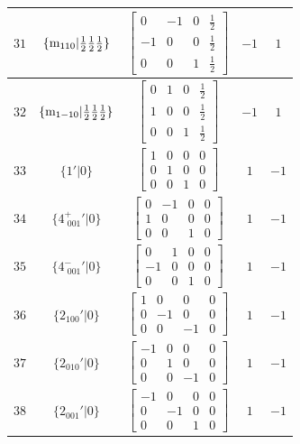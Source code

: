 \documentclass[fleqn,8pt]{jsarticle}
\begin{document}
\begin{longtable}{ccccc}
$ 31 $ & $ \{{\rm m}_{110}|\frac{1}{2} \frac{1}{2} \frac{1}{2}\} $ & $ \begin{bmatrix} 0 & -1 & 0 & \frac{1}{2} \\ -1 & 0 & 0 & \frac{1}{2} \\ 0 & 0 & 1 & \frac{1}{2} \end{bmatrix} $ & $ -1 $ & $ 1 $ \\ \hline
$ 32 $ & $ \{{\rm m}_{1-10}|\frac{1}{2} \frac{1}{2} \frac{1}{2}\} $ & $ \begin{bmatrix} 0 & 1 & 0 & \frac{1}{2} \\ 1 & 0 & 0 & \frac{1}{2} \\ 0 & 0 & 1 & \frac{1}{2} \end{bmatrix} $ & $ -1 $ & $ 1 $ \\ \hline
$ 33 $ & $ \{1{}'|0\} $ & $ \begin{bmatrix} 1 & 0 & 0 & 0 \\ 0 & 1 & 0 & 0 \\ 0 & 0 & 1 & 0 \end{bmatrix} $ & $ 1 $ & $ -1 $ \\ \hline
$ 34 $ & $ \{4^{+}_{\,\,001}{}'|0\} $ & $ \begin{bmatrix} 0 & -1 & 0 & 0 \\ 1 & 0 & 0 & 0 \\ 0 & 0 & 1 & 0 \end{bmatrix} $ & $ 1 $ & $ -1 $ \\ \hline
$ 35 $ & $ \{4^{-}_{\,\,001}{}'|0\} $ & $ \begin{bmatrix} 0 & 1 & 0 & 0 \\ -1 & 0 & 0 & 0 \\ 0 & 0 & 1 & 0 \end{bmatrix} $ & $ 1 $ & $ -1 $ \\ \hline
$ 36 $ & $ \{2{}_{100}{}'|0\} $ & $ \begin{bmatrix} 1 & 0 & 0 & 0 \\ 0 & -1 & 0 & 0 \\ 0 & 0 & -1 & 0 \end{bmatrix} $ & $ 1 $ & $ -1 $ \\ \hline
$ 37 $ & $ \{2{}_{010}{}'|0\} $ & $ \begin{bmatrix} -1 & 0 & 0 & 0 \\ 0 & 1 & 0 & 0 \\ 0 & 0 & -1 & 0 \end{bmatrix} $ & $ 1 $ & $ -1 $ \\ \hline
$ 38 $ & $ \{2{}_{001}{}'|0\} $ & $ \begin{bmatrix} -1 & 0 & 0 & 0 \\ 0 & -1 & 0 & 0 \\ 0 & 0 & 1 & 0 \end{bmatrix} $ & $ 1 $ & $ -1 $ \\ \hline

\end{longtable}
\end{document}
